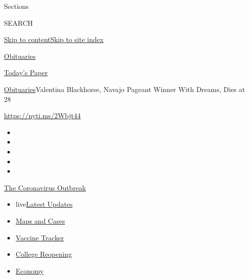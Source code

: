 Sections

SEARCH

\protect\hyperlink{site-content}{Skip to
content}\protect\hyperlink{site-index}{Skip to site index}

\href{https://www.nytimes.com/section/obituaries}{Obituaries}

\href{https://myaccount.nytimes.com/auth/login?response_type=cookie\&client_id=vi}{}

\href{https://www.nytimes.com/section/todayspaper}{Today's Paper}

\href{/section/obituaries}{Obituaries}\textbar{}Valentina Blackhorse,
Navajo Pageant Winner With Dreams, Dies at 28

\url{https://nyti.ms/2Wbjt44}

\begin{itemize}
\item
\item
\item
\item
\item
\end{itemize}

\href{https://www.nytimes.com/news-event/coronavirus?action=click\&pgtype=Article\&state=default\&region=TOP_BANNER\&context=storylines_menu}{The
Coronavirus Outbreak}

\begin{itemize}
\tightlist
\item
  live\href{https://www.nytimes.com/2020/08/03/world/coronavirus-covid-19.html?action=click\&pgtype=Article\&state=default\&region=TOP_BANNER\&context=storylines_menu}{Latest
  Updates}
\item
  \href{https://www.nytimes.com/interactive/2020/us/coronavirus-us-cases.html?action=click\&pgtype=Article\&state=default\&region=TOP_BANNER\&context=storylines_menu}{Maps
  and Cases}
\item
  \href{https://www.nytimes.com/interactive/2020/science/coronavirus-vaccine-tracker.html?action=click\&pgtype=Article\&state=default\&region=TOP_BANNER\&context=storylines_menu}{Vaccine
  Tracker}
\item
  \href{https://www.nytimes.com/2020/08/02/us/covid-college-reopening.html?action=click\&pgtype=Article\&state=default\&region=TOP_BANNER\&context=storylines_menu}{College
  Reopening}
\item
  \href{https://www.nytimes.com/live/2020/08/03/business/stock-market-today-coronavirus?action=click\&pgtype=Article\&state=default\&region=TOP_BANNER\&context=storylines_menu}{Economy}
\end{itemize}

